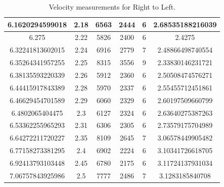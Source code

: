 \documentclass[a4paper]{report}
\numberwithin{equation}{section}
\begin{document}
\begin{table}[!ht]
\begin{tabular}{|c|c|c|c|c|c|}
        6.1620294599018 & 2.18 & 6563 & 2444 & 6 & 2.68535188216039 \\ \hline
        6.275 & 2.22 & 5826 & 2400 & 6 & 2.4275 \\ \hline
        6.32241813602015 & 2.24 & 6916 & 2779 & 7 & 2.48866498740554 \\ \hline
        6.35264341957255 & 2.25 & 8315 & 3556 & 9 & 2.33830146231721 \\ \hline
        6.38135593220339 & 2.26 & 5912 & 2360 & 6 & 2.50508474576271 \\ \hline
        6.44415917843389 & 2.28 & 5970 & 2337 & 6 & 2.55455712451861 \\ \hline
        6.46629454701589 & 2.29 & 6060 & 2329 & 6 & 2.60197509660799 \\ \hline
        6.4802065404475 & 2.3 & 6127 & 2324 & 6 & 2.63640275387263 \\ \hline
        6.53362255965293 & 2.31 & 6306 & 2305 & 6 & 2.73579175704989 \\ \hline
        6.64272211720227 & 2.35 & 8109 & 2645 & 7 & 3.06578449905482 \\ \hline
        6.77158273381295 & 2.4 & 6902 & 2224 & 6 & 3.10341726618705 \\ \hline
        6.92413793103448 & 2.45 & 6780 & 2175 & 6 & 3.11724137931034 \\ \hline
        7.06757843925986 & 2.5 & 7777 & 2486 & 7 & 3.1283185840708 \\ \hline
    \end{tabular}
    \caption{Velocity measurements for Right to Left.}
\end{table}
\end{document}
